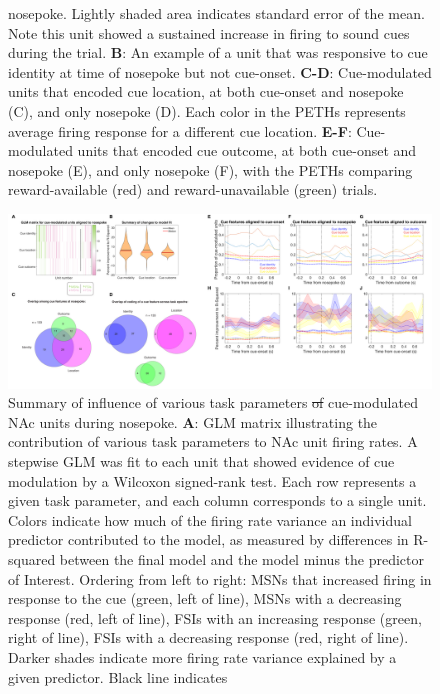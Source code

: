 \documentclass[11pt]{article}
\newcommand{\bsf}[1]{\textbf{#1}}
\providecommand{\DIFadd}[1]{{\protect\color{blue}\uwave{#1}}} %
\providecommand{\DIFdel}[1]{{\protect\color{red}\sout{#1}}}                      %
\providecommand{\DIFaddFL}[1]{\DIFadd{#1}} %
\providecommand{\DIFdelFL}[1]{\DIFdel{#1}} %
\providecommand{\DIFaddbeginFL}{} %
\providecommand{\DIFaddendFL}{} %
\providecommand{\DIFdelbeginFL}{} %
\providecommand{\DIFdelendFL}{} %
\newcommand{\DIFscaledelfig}{0.5}
\newlength{\DIFdelgraphicswidth} %
\newlength{\DIFdelgraphicsheight} %
\newcommand{\DIFaddincludegraphics}[2][]{{\color{blue}\fbox{\DIFOincludegraphics[#1]{#2}}}} %
\newcommand{\DIFdelincludegraphics}[2][]{%
\sbox{\DIFdelgraphicsbox}{\DIFOincludegraphics[#1]{#2}}%
\settoboxwidth{\DIFdelgraphicswidth}{\DIFdelgraphicsbox} %
\settoboxtotalheight{\DIFdelgraphicsheight}{\DIFdelgraphicsbox} %
\scalebox{\DIFscaledelfig}{%
\parbox[b]{\DIFdelgraphicswidth}{\usebox{\DIFdelgraphicsbox}\\[-\baselineskip] \rule{\DIFdelgraphicswidth}{0em}}\llap{\resizebox{\DIFdelgraphicswidth}{\DIFdelgraphicsheight}{%
\setlength{\unitlength}{\DIFdelgraphicswidth}%
\begin{picture}(1,1)%
\thicklines\linethickness{2pt} %
{\color[rgb]{1,0,0}\put(0,0){\framebox(1,1){}}}%
{\color[rgb]{1,0,0}\put(0,0){\line( 1,1){1}}}%
{\color[rgb]{1,0,0}\put(0,1){\line(1,-1){1}}}%
\end{picture}%
}\hspace*{3pt}}} %
} %
\DeclareRobustCommand{\DIFaddbeginFL}{\DIFOaddbeginFL \let\includegraphics\DIFaddincludegraphics} %
\DeclareRobustCommand{\DIFaddendFL}{\DIFOaddendFL \let\includegraphics\DIFOincludegraphics} %
\DeclareRobustCommand{\DIFdelbeginFL}{\DIFOdelbeginFL \let\includegraphics\DIFdelincludegraphics} %
\DeclareRobustCommand{\DIFdelendFL}{\DIFOaddendFL \let\includegraphics\DIFOincludegraphics} %
\begin{document}
\begin{figure}[h]
{nosepoke. Lightly shaded area indicates standard error of the mean. Note this
unit showed a sustained increase in firing to sound cues during the trial. \bsf{B}: An
example of a unit that was responsive to cue identity at time of nosepoke but
not cue-onset. \bsf{C-D}: Cue-modulated units that encoded cue location, at
both cue-onset and nosepoke (C), and only nosepoke (D). Each color in the
PETHs represents average firing response for a different cue
location. \bsf{E-F}: Cue-modulated units that encoded cue outcome, at both
cue-onset and nosepoke (E), and only nosepoke (F), with the PETHs comparing
reward-available (red) and reward-unavailable (green) trials.}
\label{fig:NP_examples}
\end{figure}

\begin{figure}
[h]
\centering
\DIFdelbeginFL %
\DIFdelendFL \DIFaddbeginFL \includegraphics[width=\textwidth]{Fig 10 - NP GLM.png}
\DIFaddendFL \caption{Summary of influence of various task parameters \DIFdelbeginFL \DIFdelFL{of }\DIFdelendFL \DIFaddbeginFL \DIFaddFL{on }\DIFaddendFL cue-modulated NAc
units during nosepoke. \bsf{A}: GLM matrix illustrating the contribution of various
task parameters to NAc unit firing rates. A stepwise GLM was fit to each unit that
showed evidence of cue modulation by a Wilcoxon signed-rank test. Each row
represents a given task parameter, and each column corresponds to a single unit. Colors indicate how much of the firing rate variance an
individual predictor contributed to the model, as measured by differences in
R-squared between the final model and the model minus the predictor of
Interest. Ordering from left to right: MSNs that increased firing
in response to the cue (green, left of line), MSNs with a decreasing response
(red, left of line), FSIs with an increasing response (green, right of line),
FSIs with a decreasing response (red, right of line). Darker shades indicate
more firing rate variance explained by a given predictor. Black line indicates
}
\end{figure}
\end{document}

